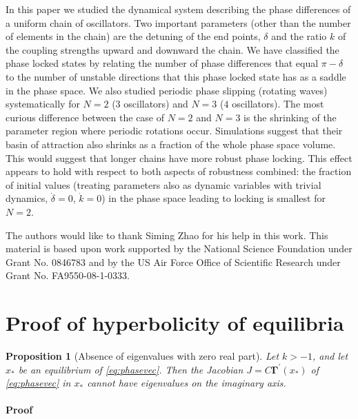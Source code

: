 \documentclass[aps,pre,twocolumn,a4paper,showkeys,showpacs]{revtex4}\usepackage{color}
\theoremstyle{plain}
\theoremstyle{plain}
\newtheorem{prop}[thm]{Proposition}
\begin{document}
\label{sec:conc}In this paper we studied the dynamical system describing the
phase differences of a uniform chain of oscillators. Two important parameters
(other than the number of elements in the chain) are the detuning of the end
points, $\delta$ and the ratio $k$ of the coupling strengths upward and
downward the chain. We have classified the phase locked states by relating the
number of phase differences that equal $\pi-\delta$ to the number of unstable
directions that this phase locked state has as a saddle in the phase space. We
also studied periodic phase slipping (rotating waves) systematically for $N=2$
($3$ oscillators) and $N=3$ ($4$ oscillators). The most curious difference
between the case of $N=2$ and $N=3$ is the shrinking of the parameter region
where periodic rotations occur. Simulations suggest that their basin of
attraction also shrinks as a fraction of the whole phase space volume. This
would suggest that longer chains have more robust phase locking. This effect
appears to hold with respect to both aspects of robustness combined: the
fraction of initial values (treating parameters also as dynamic variables with
trivial dynamics, $\dot{\delta}=0$, $\dot{k}=0$) in the phase space leading to
locking is smallest for $N=2$.

\begin{acknowledgments}
The authors would like to thank Siming Zhao for his help in this  work. This
material is based upon work supported by the National  Science Foundation
under Grant No. 0846783 and by the US Air Force  Office of Scientific Research
under Grant No. FA9550-08-1-0333.
\end{acknowledgments}




\appendix

\section{Proof of hyperbolicity of equilibria}

\label{sec:smallproofs}

\begin{prop}
[Absence of eigenvalues with zero real part]\label{thm:hyp} Let $k>-1$, and
let $x_{*}$ be an equilibrium of \eqref{eq:phasevec}. Then the Jacobian
$J=C\boldsymbol{\Gamma}^{\prime}(x_{*})$ of \eqref{eq:phasevec} in $x_{*}$
cannot have eigenvalues on the imaginary axis.
\end{prop}

\paragraph*{Proof}
\end{document}
